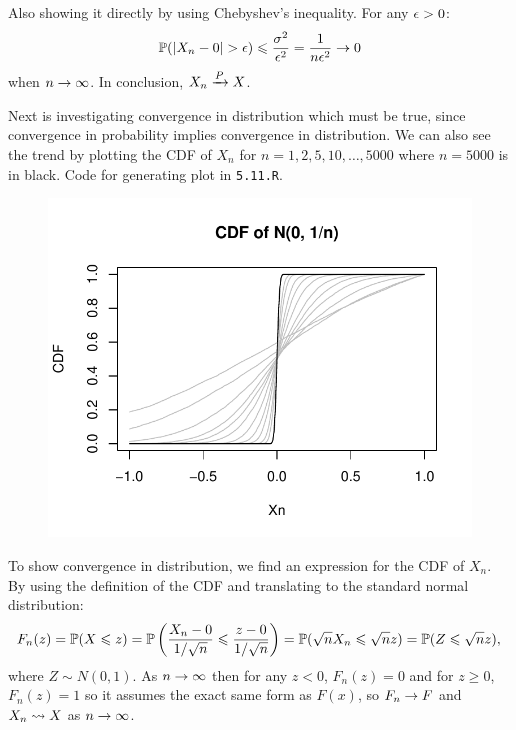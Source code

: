 Also showing it directly by using Chebyshev's inequality. For any $\eps > 0$:
$$
\P(|X_n - 0| > \eps) \leq \frac{\sigma^2}{\eps^2} = \frac{1}{n\eps^2} \ra  0
$$
when $n\ra\infty$. In conclusion, $X_n\raP X$.

Next is investigating convergence in distribution which must be true, since convergence
in probability implies convergence in distribution. We can also see the trend by
plotting the CDF of $X_n$ for $n=1, 2, 5, 10, \ldots, 5000$ where $n=5000$ is in black.
Code for generating plot in \texttt{5.11.R}.
\begin{figure}[H]
    \centering
    \includegraphics[scale=0.8]{ch5_11.pdf}
\end{figure}
To show convergence in distribution, we find an expression for the CDF of $X_n$.
By using the definition of the CDF and translating to the standard normal distribution:
$$
F_n(z) = \P(X\leq z) = \P\left(\frac{X_n - 0}{1/\sqrt{n}}\leq \frac{z - 0}{1/\sqrt{n}}\right)
= \P(\sqrt{n}X_n \leq \sqrt{n}z) = \P(Z\leq \sqrt{n}z),
$$
where $Z\sim N(0,1)$. As $n\ra\infty$ then for any $z<0$, $F_n(z) = 0$ and for $z\geq 0$,
$F_n(z) = 1$ so it assumes the exact same form as $F(x)$, so $F_n\ra F$ and $X_n\raD X$
as $n\ra\infty$.


